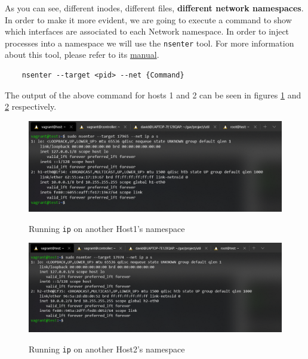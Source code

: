 \documentclass[12pt]{article}
\begin{document}
			As you can see, different inodes, different files, \textbf{different network namespaces}. In order to make it more evident, we are going to execute a command to show which interfaces are associated to each Network namespace. In order to inject processes into a namespace we will use the \texttt{nsenter} tool. For more information about this tool, please refer to its \href{http://man7.org/linux/man-pages/man1/nsenter.1.html}{manual}.

			\begin{verbatim}
	nsenter --target <pid> --net {Command}
			\end{verbatim}

			The output of the above command for hosts 1 and 2 can be seen in figures \ref{f:host1_intf} and \ref{f:host2_intf} respectively.
			
			\newpage

			\begin{figure}[!htb]
				\centering
				\includegraphics[width=\linewidth]{host1_intf.png}
				\label{f:host1_intf}
				\caption{Running \texttt{ip} on another Host1's namespace}
			\end{figure}

			\begin{figure}[!htb]
				\centering
				\includegraphics[width=\linewidth]{host2_intf.png}
				\label{f:host2_intf}
				\caption{Running \texttt{ip} on another Host2's namespace}
			\end{figure}
\end{document}
